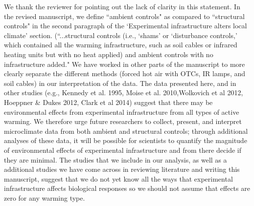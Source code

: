 \documentclass[11pt,a4paper]{letter}
\begin{document}
\par We thank the reviewer for pointing out the lack of clarity in this statement. In the revised manuscript, we define ``ambient controls" as compared to ``structural controls" in the second paragraph of the `Experimental infrastructure alters local climate' section. (``...structural controls (i.e., `shams' or `disturbance controls,' which contained all the warming infrastructure, such as soil cables or infrared heating units but with no heat applied) and ambient controls with no infrastructure added." We have worked in other parts of the manuscript to more clearly separate the different methods (forced hot air with OTCs, IR lamps, and soil cables) in our interpretation of the data. The data presented here, and in other studies (e.g., Kennedy et al. 1995, Moise et al.  2010,Wolkovich et al 2012, Hoeppner & Dukes 2012, Clark et al 2014) suggest that there may be environmental effects from experimental infrastructure from all types of active warming. We therefore urge future researchers to collect, present, and interpret microclimate data from both ambient and structural controls; through additional analyses of these data, it will be possible for scientists to quantify the magnitude of environmental effects of experimental infrastructure and from there decide if they are minimal. The studies that we include in our analysis, as well as a additional studies we have come across in reviewing literature and writing this manuscript, suggest that we do not yet know all the ways that experimental infrastructure affects biological responses so we should not assume that effects are zero for any warming type. 
\\
\end{document}
